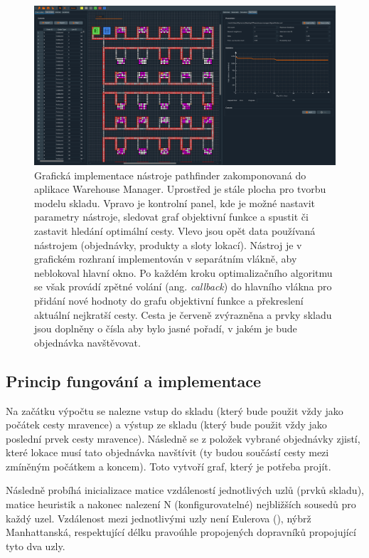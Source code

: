 \begin{figure}[t]
    \centering
    \includegraphics[width=0.99\linewidth]{figures/implementace/WarehouseManagerPaf.png}
    \caption{Grafická implementace nástroje pathfinder zakomponovaná do aplikace Warehouse Manager. Uprostřed je stále plocha pro tvorbu modelu skladu. Vpravo je kontrolní panel, kde je možné nastavit parametry nástroje, sledovat graf objektivní funkce a spustit či zastavit hledání optimální cesty. Vlevo jsou opět data používaná nástrojem (objednávky, produkty a sloty lokací). Nástroj je v grafickém rozhraní implementován v separátním vlákně, aby neblokoval hlavní okno. Po každém kroku optimalizačního algoritmu se však provádí zpětné volání (ang. \emph{callback}) do hlavního vlákna pro přidání nové hodnoty do grafu objektivní funkce a překreslení aktuální nejkratší cesty. Cesta je červeně zvýrazněna a prvky skladu jsou doplněny o čísla aby bylo jasné pořadí, v jakém je bude objednávka navštěvovat.}
    \label{fig:UI_pathFinder}
\end{figure}

\subsection{Princip fungování a implementace}
Na začátku výpočtu se nalezne vstup do skladu (který bude použit vždy jako počátek cesty mravence) a výstup ze skladu (který bude použit vždy jako poslední prvek cesty mravence). Následně se z položek vybrané objednávky zjistí, které lokace musí tato objednávka navštívit (ty budou součástí cesty mezi zmíněným počátkem a koncem). Toto vytvoří graf, který je potřeba projít.

Následně probíhá inicializace matice vzdáleností jednotlivých uzlů (prvků skladu), matice heuristik a nakonec nalezení N (konfigurovatelné) nejbližších sousedů pro každý uzel. Vzdálenost mezi jednotlivými uzly není Eulerova (), nýbrž Manhattanská, respektující délku pravoúhle propojených dopravníků propojující tyto dva uzly.


